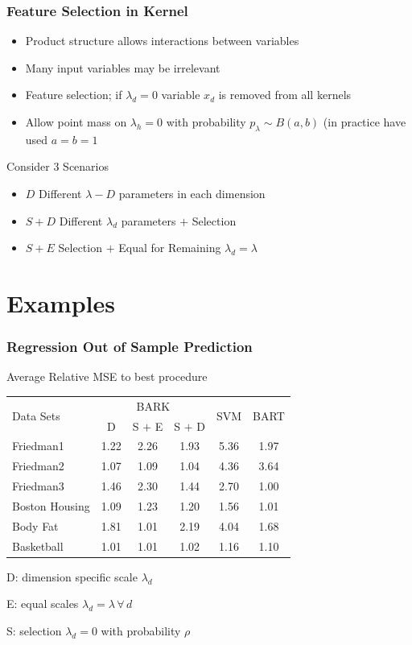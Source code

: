 \documentclass[]{beamer}
\newcommand{\bs}[2]{\begin{frame} \frametitle{#1}
{#2}
\end{frame} }
\begin{document}
\bs{Feature Selection in Kernel} {
\begin{itemize}
\item Product structure allows interactions between variables  \pause
\item Many input variables may be irrelevant \pause
\item Feature selection; if $\lambda_d = 0$ variable $x_d$ is removed
  from all kernels \pause
\item Allow point mass on $\lambda_h = 0$ with probability $p_\lambda
  \sim B(a,b)$  (in practice have used $a = b = 1$ \pause
\end{itemize}

Consider 3 Scenarios

\begin{itemize}
\item $D$ Different $\lambda-D$ parameters in each dimension \pause
\item $S + D$ Different $\lambda_d$ parameters $+$ Selection \pause
\item $S + E$ Selection $+$ Equal for Remaining $\lambda_d = \lambda$
\end{itemize}

}

\section{Examples}

\bs{Regression Out of Sample Prediction} {
Average Relative MSE to best procedure
\small{
  \begin{tabular}[ht]{|l|c|c|c|c|c|}
    \hline
  \multirow{2}{*}{Data Sets} &
  \multicolumn{3}{c|}{BARK} &
  \multirow{2}{*}{SVM}&
  \multirow{2}{*}{BART} \\
  \cline{2-4}
  &  D
  & S $+$ E & S $+$ D && \\
    \hline
  Friedman1       %
  & 1.22 & 2.26 & 1.93 & 5.36 & 1.97 \\
  Friedman2       %
  & 1.07 & 1.09 & 1.04 & 4.36 & 3.64 \\
  Friedman3       %
  & 1.46 & 2.30 & 1.44 & 2.70 & 1.00 \\
  Boston Housing  %
  & 1.09 & 1.23 & 1.20 & 1.56 & 1.01 \\
  Body Fat        %
  & 1.81 & 1.01 & 2.19 & 4.04 & 1.68 \\
  Basketball      %
  & 1.01 & 1.01 & 1.02 & 1.16 & 1.10 \\\hline
  \end{tabular}
}

D: dimension specific scale $\lambda_d$

E: equal scales $\lambda_d = \lambda \, \forall \, d$

S: selection $\lambda_d = 0$ with probability $\rho$

}
\end{document}
